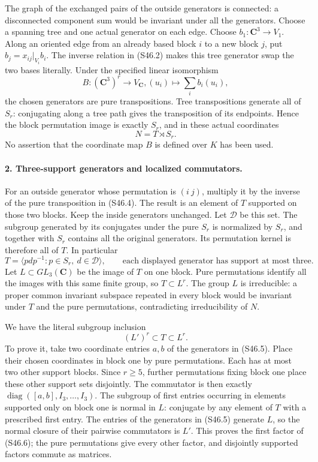 The graph of the exchanged pairs of the outside generators is
connected: a disconnected component sum would be invariant under
all the generators. Choose a spanning tree and one actual generator
on each edge. Choose \(b_1:\mathbf C^3\longrightarrow V_1\).
Along an oriented edge from an already based block \(i\) to a new
block \(j\), put \(b_j=x_{ij}|_{V_i}b_i\). The inverse relation
in (S46.2) makes this tree generator swap the two bases literally.
Under the specified linear isomorphism
\[
 B:(\mathbf C^3)^r\longrightarrow V_{\mathbf C},
       (u_i)\longmapsto\sum_i b_i(u_i),
 \tag{S46.3}
\]
the chosen generators are pure transpositions. Tree transpositions
generate all of \(S_r\): conjugating along a tree path gives the
transposition of its endpoints. Hence the block permutation image
is exactly \(S_r\), and in these actual coordinates
\[
                         N=T\rtimes S_r.
 \tag{S46.4}
\]
No assertion that the coordinate map \(B\) is defined over \(K\)
has been used.

\paragraph{2. Three-support generators and localized commutators.}
For an outside generator whose permutation is \((i\ j)\),
multiply it by the inverse of the pure transposition in (S46.4).
The result is an element of \(T\) supported on those two blocks.
Keep the inside generators unchanged. Let \(\mathcal D\) be
this set. The subgroup generated by its conjugates under the
pure \(S_r\) is normalized by \(S_r\), and together with
\(S_r\) contains all the original generators. Its permutation
kernel is therefore all of \(T\). In particular
\[
 T=\langle p d p^{-1}:p\in S_r,\ d\in\mathcal D\rangle,
 \qquad \text{each displayed generator has support at most three}.
 \tag{S46.5}
\]
Let \(L\subset GL_3(\mathbf C)\) be the image of \(T\)
on one block. Pure permutations identify all the images with
this same finite group, so \(T\subset L^r\). The group \(L\)
is irreducible: a proper common invariant subspace repeated in
every block would be invariant under \(T\) and the pure
permutations, contradicting irreducibility of \(N\).

We have the literal subgroup inclusion
\[
                              (L')^r\subset T\subset L^r.
 \tag{S46.6}
\]
To prove it, take two coordinate entries \(a,b\) of the
generators in (S46.5). Place their chosen coordinates in block
one by pure permutations. Each has at most two other support
blocks. Since \(r\ge5\), further permutations fixing block one
place these other support sets disjointly. The commutator is
then exactly \(\operatorname{diag}([a,b],I_3,\ldots,I_3)\).
The subgroup of first entries occurring in elements supported
only on block one is normal in \(L\): conjugate by any element
of \(T\) with a prescribed first entry. The entries of the
generators in (S46.5) generate \(L\), so the normal closure
of their pairwise commutators is \(L'\). This proves the first
factor of (S46.6); the pure permutations give every other factor,
and disjointly supported factors commute as matrices.

